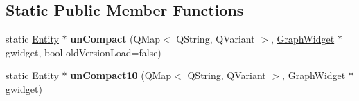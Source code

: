 \subsection*{Static Public Member Functions}
\begin{DoxyCompactItemize}
\item 
\mbox{\label{class_entity_a5ce569a1841bf5d16cebf9303c8ef327}} 
static \hyperlink{class_entity}{Entity} $\ast$ {\bfseries un\+Compact} (Q\+Map$<$ Q\+String, Q\+Variant $>$, \hyperlink{class_graph_widget}{Graph\+Widget} $\ast$gwidget, bool old\+Version\+Load=false)
\item 
\mbox{\label{class_entity_a1ef7069ffea008b543275ad7d02baf8d}} 
static \hyperlink{class_entity}{Entity} $\ast$ {\bfseries un\+Compact10} (Q\+Map$<$ Q\+String, Q\+Variant $>$, \hyperlink{class_graph_widget}{Graph\+Widget} $\ast$gwidget)
\end{DoxyCompactItemize}
